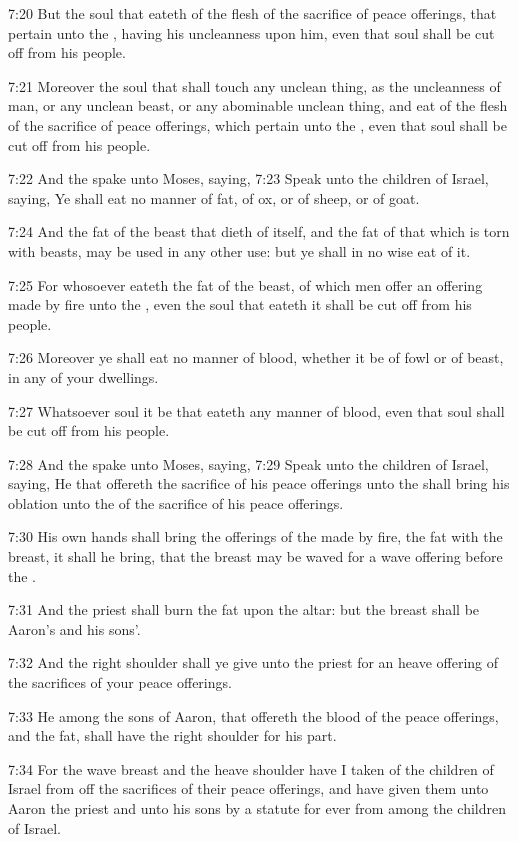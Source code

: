 7:20 But the soul that eateth of the flesh of the sacrifice of peace offerings, that pertain unto the \LORD, having his uncleanness upon him, even that soul shall be cut off from his people.

7:21 Moreover the soul that shall touch any unclean thing, as the uncleanness of man, or any unclean beast, or any abominable unclean thing, and eat of the flesh of the sacrifice of peace offerings, which pertain unto the \LORD, even that soul shall be cut off from his people.

7:22 And the \LORD spake unto Moses, saying, 7:23 Speak unto the children of Israel, saying, Ye shall eat no manner of fat, of ox, or of sheep, or of goat.

7:24 And the fat of the beast that dieth of itself, and the fat of that which is torn with beasts, may be used in any other use: but ye shall in no wise eat of it.

7:25 For whosoever eateth the fat of the beast, of which men offer an offering made by fire unto the \LORD, even the soul that eateth it shall be cut off from his people.

7:26 Moreover ye shall eat no manner of blood, whether it be of fowl or of beast, in any of your dwellings.

7:27 Whatsoever soul it be that eateth any manner of blood, even that soul shall be cut off from his people.

7:28 And the \LORD spake unto Moses, saying, 7:29 Speak unto the children of Israel, saying, He that offereth the sacrifice of his peace offerings unto the \LORD shall bring his oblation unto the \LORD of the sacrifice of his peace offerings.

7:30 His own hands shall bring the offerings of the \LORD made by fire, the fat with the breast, it shall he bring, that the breast may be waved for a wave offering before the \LORD.

7:31 And the priest shall burn the fat upon the altar: but the breast shall be Aaron's and his sons'.

7:32 And the right shoulder shall ye give unto the priest for an heave offering of the sacrifices of your peace offerings.

7:33 He among the sons of Aaron, that offereth the blood of the peace offerings, and the fat, shall have the right shoulder for his part.

7:34 For the wave breast and the heave shoulder have I taken of the children of Israel from off the sacrifices of their peace offerings, and have given them unto Aaron the priest and unto his sons by a statute for ever from among the children of Israel.

